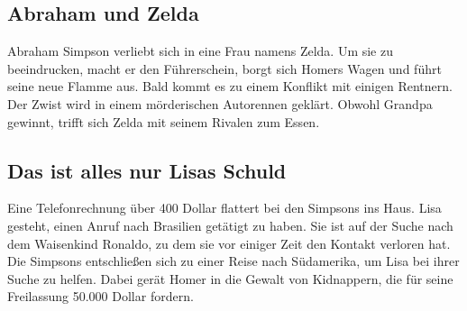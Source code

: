 \subsection{Abraham und Zelda}\label{DABF09}
Abraham Simpson verliebt sich in eine Frau namens Zelda. Um sie zu beeindrucken, macht er den Führerschein, borgt sich Homers Wagen und führt seine neue Flamme aus. Bald kommt es zu einem Konflikt mit einigen Rentnern. Der Zwist wird in einem mörderischen Autorennen geklärt. Obwohl Grandpa gewinnt, trifft sich Zelda mit seinem Rivalen zum Essen.


\subsection{Das ist alles nur Lisas Schuld}\label{DABF10}
Eine Telefonrechnung über 400 Dollar flattert bei den Simpsons ins Haus. Lisa gesteht, einen Anruf nach Brasilien getätigt zu haben. Sie ist auf der Suche nach dem Waisenkind Ronaldo, zu dem sie vor einiger Zeit den Kontakt verloren hat. Die Simpsons entschließen sich zu einer Reise nach Südamerika, um Lisa bei ihrer Suche zu helfen. Dabei gerät Homer in die Gewalt von Kidnappern, die für seine Freilassung 50.000 Dollar fordern.




